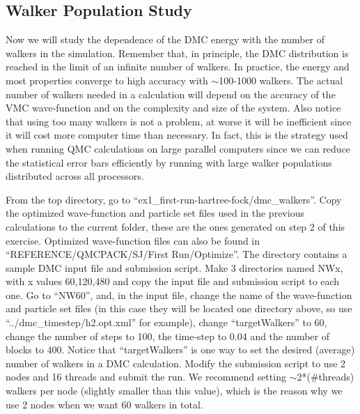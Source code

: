 \subsection{Walker Population Study}
Now we will study the dependence of the DMC energy with the number of walkers in the
simulation. Remember that, in principle, the DMC distribution is reached in the limit of
an infinite number of walkers. In practice, the energy and most properties converge to high
accuracy with $\sim$100-1000 walkers. The actual number of walkers needed in a calculation
will depend on the accuracy of the VMC wave-function and on the complexity and size of
the system. Also notice that using too many walkers is not a problem, at worse it will be
inefficient since it will cost more computer time than necessary. In fact, this is the strategy
used when running QMC calculations on large parallel computers since we can reduce the
statistical error bars efficiently by running with large walker populations distributed across
all processors.

From the top directory, go to ``ex1\_first-run-hartree-fock/dmc\_walkers''. Copy the
optimized wave-function and particle set files used in the previous calculations to the current
folder, these are the ones generated on step 2 of this exercise. Optimized wave-function files
can also be found in ``REFERENCE/QMCPACK/SJ/First Run/Optimize''. The directory
contains a sample DMC input file and submission script. Make 3 directories named NWx,
with x values 60,120,480 and copy the input file and submission script to each one. Go
to ``NW60'', and, in the input file, change the name of the wave-function and particle set
files (in this case they will be located one directory above, so use ``../dmc\_timestep/h2.opt.xml'' for
example), change ``targetWalkers'' to 60, change the number of steps to 100, the time-step
to 0.04 and the number of blocks to 400. Notice that ``targetWalkers'' is one way to set the
desired (average) number of walkers in a DMC calculation. Modify the submission script
to use 2 nodes and 16 threads and submit the run. We recommend setting $\sim$2*(\#threads)
walkers per node (slightly smaller than this value), which is the reason why we use 2 nodes
when we want 60 walkers in total.

